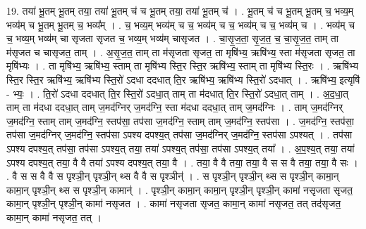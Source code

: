 \documentclass[17pt]{extarticle}
\begin{document}
19. तया॑ भू॒तम् भू॒तम् तया॒ तया॑ भू॒तम् च॑ च भू॒तम् तया॒ तया॑ भू॒तम् च॑ । . भू॒तम् च॑ च भू॒तम् भू॒तम् च॒ भव्य॒म् भव्य॑म् च भू॒तम् भू॒तम् च॒ भव्य᳚म् । . च॒ भव्य॒म् भव्य॑म् च च॒ भव्य॑म् च च॒ भव्य॑म् च च॒ भव्य॑म् च । . भव्य॑म् च च॒ भव्य॒म् भव्य॑म् चा सृजता सृजत च॒ भव्य॒म् भव्य॑म् चासृजत । . चा॒सृ॒ज॒ता॒ सृ॒ज॒त॒ च॒ चा॒सृ॒ज॒त॒ ताम् ता म॑सृजत च चासृजत॒ ताम् । . अ॒सृ॒ज॒त॒ ताम् ता म॑सृजता सृजत॒ ता मृषि॑भ्य॒ ऋषि॑भ्य॒ स्ता म॑सृजता सृजत॒ ता मृषि॑भ्यः । . ता मृषि॑भ्य॒ ऋषि॑भ्य॒ स्ताम् ता मृषि॑भ्य स्ति॒र स्ति॒र ऋषि॑भ्य॒ स्ताम् ता मृषि॑भ्य स्ति॒रः । . ऋषि॑भ्य स्ति॒र स्ति॒र ऋषि॑भ्य॒ ऋषि॑भ्य स्ति॒रो॑ ऽदधा ददधात् ति॒र ऋषि॑भ्य॒ ऋषि॑भ्य स्ति॒रो॑ ऽदधात् । . ऋषि॑भ्य॒ इत्यृषि॑ - भ्यः॒ । . ति॒रो॑ ऽदधा ददधात् ति॒र स्ति॒रो॑ ऽदधा॒त् ताम् ता म॑दधात् ति॒र स्ति॒रो॑ ऽदधा॒त् ताम् । . अ॒द॒धा॒त् ताम् ता म॑दधा ददधा॒त् ताम् ज॒मद॑ग्निर् ज॒मद॑ग्नि॒ स्ता म॑दधा ददधा॒त् ताम् ज॒मद॑ग्निः । . ताम् ज॒मद॑ग्निर् ज॒मद॑ग्नि॒ स्ताम् ताम् ज॒मद॑ग्नि॒ स्तप॑सा॒ तप॑सा ज॒मद॑ग्नि॒ स्ताम् ताम् ज॒मद॑ग्नि॒ स्तप॑सा । . ज॒मद॑ग्नि॒ स्तप॑सा॒ तप॑सा ज॒मद॑ग्निर् ज॒मद॑ग्नि॒ स्तप॑सा ऽपश्य दपश्य॒त् तप॑सा ज॒मद॑ग्निर् ज॒मद॑ग्नि॒ स्तप॑सा ऽपश्यत् । . तप॑सा ऽपश्य दपश्य॒त् तप॑सा॒ तप॑सा ऽपश्य॒त् तया॒ तया॑ ऽपश्य॒त् तप॑सा॒ तप॑सा ऽपश्य॒त् तया᳚ । . अ॒प॒श्य॒त् तया॒ तया॑ ऽपश्य दपश्य॒त् तया॒ वै वै तया॑ ऽपश्य दपश्य॒त् तया॒ वै । . तया॒ वै वै तया॒ तया॒ वै स स वै तया॒ तया॒ वै सः । . वै स स वै वै स पृश्ञी॒न् पृश्ञी॒न् थ्स वै वै स पृश्ञीन्॑ । . स पृश्ञी॒न् पृश्ञी॒न् थ्स स पृश्ञी॒न् कामा॒न् कामा॒न् पृश्ञी॒न् थ्स स पृश्ञी॒न् कामान्॑ । . पृश्ञी॒न् कामा॒न् कामा॒न् पृश्ञी॒न् पृश्ञी॒न् कामा॑ नसृजता सृजत॒ कामा॒न् पृश्ञी॒न् पृश्ञी॒न् कामा॑ नसृजत । . कामा॑ नसृजता सृजत॒ कामा॒न् कामा॑ नसृजत॒ तत् तद॑सृजत॒ कामा॒न् कामा॑ नसृजत॒ तत् । \newline
\end{document}
